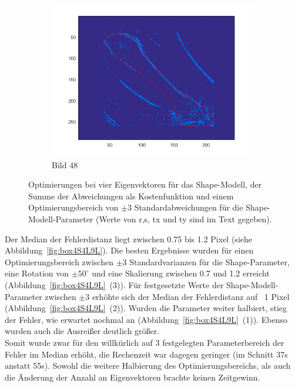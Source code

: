 \documentclass[]{report}
\begin{document}
\begin{enumerate}
\begin{enumerate}
\begin{figure}
\begin{subfigure}[t]{0.3\textwidth}
						\label{fig:image38_4EV_dist_3STD}
					\end{subfigure}
					\qquad
					\begin{subfigure}[t]{0.3\textwidth}
						\centering
						\includegraphics[width=\textwidth]{figures/image48_4EV_dist_3STD.png}
						\caption{Bild 48}
						\label{fig:image48_4EV_dist_3STD}
					\end{subfigure}
					\caption{Optimierungen bei vier Eigenvektoren für das Shape-Modell, der Summe der Abweichungen als Kostenfunktion und einem Optimierungsbereich von $\pm3$ Standardabweichungen für die Shape-Modell-Parameter (Werte von r,s, tx und ty sind im Text gegeben).}
					\label{fig:4EV_dist_3STD}	
				\end{figure}
				Der Median der Fehlerdistanz liegt zwischen 0.75 bis 1.2 Pixel (siehe Abbildung~\ref{fig:box4S4L9L}). Die besten Ergebnisse wurden für einen Optimierungsbereich zwischen $\pm3$ Standardvarianzen für die Shape-Parameter, eine Rotation von $\pm50^\circ$ und eine Skalierung zwischen 0.7 und 1.2 erreicht (Abbildung~\ref{fig:box4S4L9L}~(3)). Für festgesetzte Werte der Shape-Modell-Parameter zwischen $\pm3$ erhöhte sich der Median der Fehlerdistanz auf ~1 Pixel (Abbildung~\ref{fig:box4S4L9L}~(2)). Wurden die Parameter weiter halbiert, stieg der Fehler, wie erwartet nochmal an (Abbildung~\ref{fig:box4S4L9L}~(1)). Ebenso wurden auch die Ausreißer deutlich größer.\\
				Somit wurde zwar für den willkürlich auf 3 festgelegten Parameterbereich der Fehler im Median erhöht, die Rechenzeit war dagegen geringer (im Schnitt 37s anstatt 55s). Sowohl die weitere Halbierung des Optimierungsbereichs, als auch die Änderung der Anzahl an Eigenvektoren brachte keinen Zeitgewinn.\\

\end{enumerate}
\end{enumerate}
\end{document}
